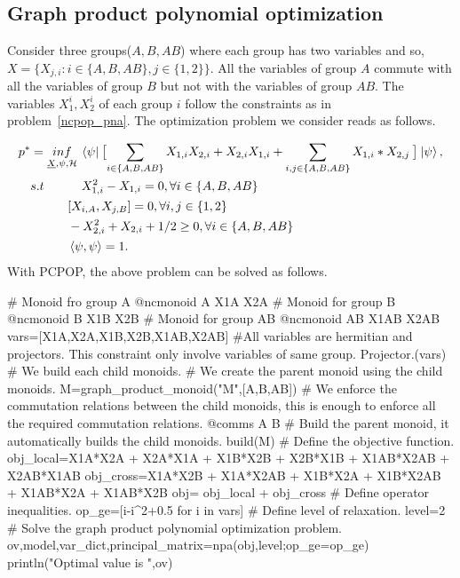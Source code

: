 \subsection{Graph product polynomial optimization}
\label{sec:gpop}
Consider three groups($A,B,AB$) where each group has two variables and so, $X=\{X_{j,i} : i \in \{A,B,AB\},j \in \{1,2\}\}$. All the variables of group $A$ commute with all the variables of group $B$ but not with the variables of group $AB$. The variables $X_1^i,X_2^i$ of each group $i$ follow the constraints as in problem~\ref{ncpop_pna}. The optimization problem we consider reads as follows.

\begin{equation}
  \label{gppop}
\begin{split}
       p^* &=\underset{\underline{X} , \psi , \mathcal{H}}{inf} \: \braket{\psi| \:\bigl[\sum_{i \in \{A,B,AB\}} X_{1,i}  X_{2,i} + X_{2,i}  X_{1,i} + \sum_{i,j \in \{A,B,AB\}} X_{1,i}*X_{2,j} \:\bigr]\: |\psi}, \\
    & s.t \quad \qquad X_{1,i}^2 - X_{1,i} = 0,\forall i \in \{A,B,AB\} \\
    & \quad \qquad [X_{i,A},X_{j,B}]=0, \forall i,j \in \{1,2\}\\
    & \qquad \quad -X_{2,i}^2+X_{2,i}+1/2 \geq 0,\forall i \in \{A,B,AB\} \\
    & \qquad \quad \braket{\psi , \psi} = 1. \\ 
\end{split}
\end{equation} 
With PCPOP, the above problem can be solved as follows.
\begin{code}
    # Monoid fro group A
    @ncmonoid A X1A X2A
    # Monoid for group B
    @ncmonoid B X1B X2B
    # Monoid for group AB
    @ncmonoid AB X1AB X2AB
    vars=[X1A,X2A,X1B,X2B,X1AB,X2AB]
     #All variables are hermitian and projectors. This constraint only involve variables of same group.
    Projector.(vars)
    # We build each child monoids.
    # We create the parent monoid using the child monoids.
    M=graph_product_monoid("M",[A,B,AB])
    # We enforce the commutation relations between the child monoids, this is enough to enforce all the required commutation relations.
    @comms A B
    # Build the parent monoid, it automatically builds the child monoids.
    build(M)
    # Define the objective function.
    obj_local=X1A*X2A + X2A*X1A + X1B*X2B + X2B*X1B + X1AB*X2AB + X2AB*X1AB
    obj_cross=X1A*X2B + X1A*X2AB + X1B*X2A + X1B*X2AB + X1AB*X2A + X1AB*X2B
    obj= obj_local + obj_cross
    # Define operator inequalities.
    op_ge=[i-i^2+0.5 for i in vars]
    # Define  level of relaxation.
    level=2
    # Solve the graph product polynomial optimization problem.
    ov,model,var_dict,principal_matrix=npa(obj,level;op_ge=op_ge)
    println("Optimal value is ",ov)
\end{code}

